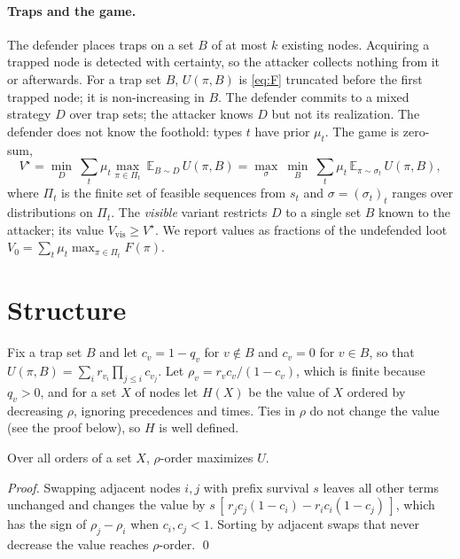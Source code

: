 \documentclass[runningheads]{llncs}
\newcommand{\Exp}{\mathbb{E}}
\begin{document}
\paragraph{Traps and the game.}
The defender places traps on a set $B$ of at most $k$ existing nodes. Acquiring a trapped node is detected with certainty, so the attacker collects nothing from it or afterwards. For a trap set $B$, $U(\pi,B)$ is \eqref{eq:F} truncated before the first trapped node; it is non-increasing in $B$. The defender commits to a mixed strategy $D$ over trap sets; the attacker knows $D$ but not its realization. The defender does not know the foothold: types $t$ have prior $\mu_t$. The game is zero-sum,
\begin{equation}\label{eq:game}
V^\star=\min_{D}\ \sum_t \mu_t \max_{\pi\in\Pi_t}\ \Exp_{B\sim D}\,U(\pi,B)
=\max_{\sigma}\ \min_{B}\ \sum_t \mu_t\, \Exp_{\pi\sim\sigma_t}\,U(\pi,B),
\end{equation}
where $\Pi_t$ is the finite set of feasible sequences from $s_t$ and $\sigma=(\sigma_t)_t$ ranges over distributions on $\Pi_t$. The \emph{visible} variant restricts $D$ to a single set $B$ known to the attacker; its value $V_{\mathrm{vis}}\ge V^\star$. We report values as fractions of the undefended loot $V_0=\sum_t \mu_t\max_{\pi\in\Pi_t}F(\pi)$.

\section{Structure}\label{sec:structure}

Fix a trap set $B$ and let $c_v=1-q_v$ for $v\notin B$ and $c_v=0$ for $v\in B$, so that $U(\pi,B)=\sum_i r_{v_i}\prod_{j\le i}c_{v_j}$. Let $\rho_v=r_vc_v/(1-c_v)$, which is finite because $q_v>0$, and for a set $X$ of nodes let $H(X)$ be the value of $X$ ordered by decreasing $\rho$, ignoring precedences and times. Ties in $\rho$ do not change the value (see the proof below), so $H$ is well defined.

\begin{proposition}\label{prop:index}
Over all orders of a set $X$, $\rho$-order maximizes $U$.
\end{proposition}
\begin{proof}
Swapping adjacent nodes $i,j$ with prefix survival $s$ leaves all other terms unchanged and changes the value by $s\,[\,r_jc_j(1-c_i)-r_ic_i(1-c_j)\,]$, which has the sign of $\rho_j-\rho_i$ when $c_i,c_j<1$. Sorting by adjacent swaps that never decrease the value reaches $\rho$-order. \qed
\end{proof}
\end{document}
